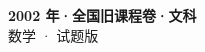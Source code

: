\documentclass[zihao=-4, a4paper]{ctexart}
\begin{document}
\begin{center}
  {\Large\bfseries 2002 年·全国旧课程卷·文科}\\[4pt]
  {\large 数学 · 试题版}
\end{center}
\medskip
{}

\end{document}
